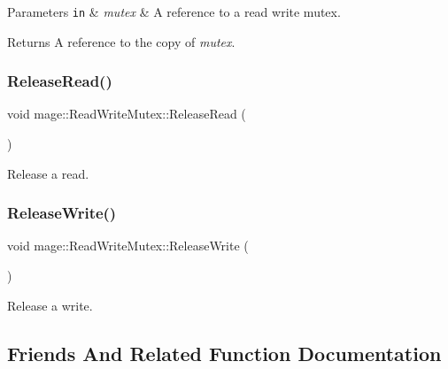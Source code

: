 \begin{DoxyParams}[1]{Parameters}
\mbox{\tt in}  & {\em mutex} & A reference to a read write mutex. \\
\hline
\end{DoxyParams}
\begin{DoxyReturn}{Returns}
A reference to the copy of {\itshape mutex}. 
\end{DoxyReturn}
\hypertarget{classmage_1_1_read_write_mutex_a0af5059a9bd16abd8a21b15e7ebe053d}{}\label{classmage_1_1_read_write_mutex_a0af5059a9bd16abd8a21b15e7ebe053d} 
\subsubsection{\texorpdfstring{Release\+Read()}{ReleaseRead()}}
{\footnotesize\ttfamily void mage\+::\+Read\+Write\+Mutex\+::\+Release\+Read (\begin{DoxyParamCaption}{ }\end{DoxyParamCaption})\hspace{0.3cm}{\ttfamily [private]}}

Release a read. \hypertarget{classmage_1_1_read_write_mutex_ad0fd296bdaa212f54a58372c8dfe1d1d}{}\label{classmage_1_1_read_write_mutex_ad0fd296bdaa212f54a58372c8dfe1d1d} 
\subsubsection{\texorpdfstring{Release\+Write()}{ReleaseWrite()}}
{\footnotesize\ttfamily void mage\+::\+Read\+Write\+Mutex\+::\+Release\+Write (\begin{DoxyParamCaption}{ }\end{DoxyParamCaption})\hspace{0.3cm}{\ttfamily [private]}}

Release a write. 

\subsection{Friends And Related Function Documentation}
\hypertarget{classmage_1_1_read_write_mutex_a7ae207fc659160d3c55a5ba1468007f7}{}\label{classmage_1_1_read_write_mutex_a7ae207fc659160d3c55a5ba1468007f7} 
